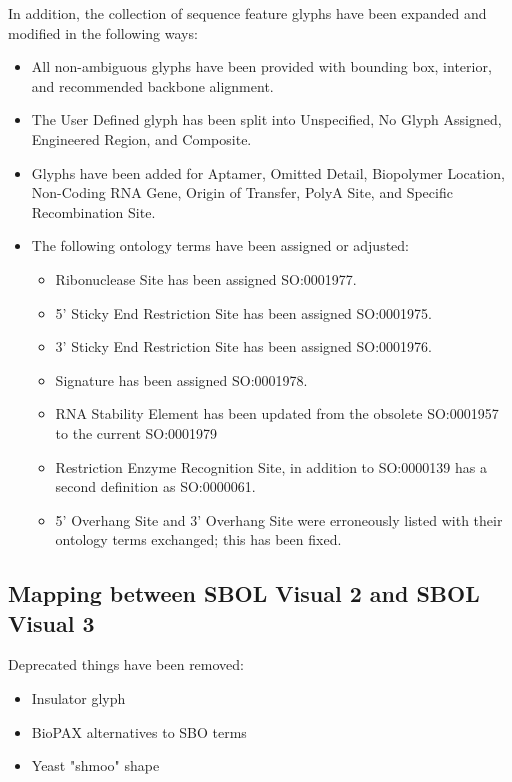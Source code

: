 In addition, the collection of sequence feature glyphs have been expanded and modified in the following ways:
\begin{itemize}
\item All non-ambiguous glyphs have been provided with bounding box, interior, and recommended backbone alignment.
\item The User Defined glyph has been split into Unspecified, No Glyph Assigned, Engineered Region, and Composite. 
\item Glyphs have been added for Aptamer, Omitted Detail, Biopolymer Location, Non-Coding RNA Gene, Origin of Transfer, PolyA Site, and Specific Recombination Site.
\item The following ontology terms have been assigned or adjusted: 
	\begin{itemize}
	\item Ribonuclease Site has been assigned SO:0001977.
	\item 5' Sticky End Restriction Site has been assigned SO:0001975.
	\item 3' Sticky End Restriction Site has been assigned SO:0001976.
	\item Signature has been assigned SO:0001978.
	\item RNA Stability Element has been updated from the obsolete SO:0001957 to the current SO:0001979
	\item Restriction Enzyme Recognition Site, in addition to SO:0000139 has a second definition as SO:0000061.
	\item 5' Overhang Site and 3' Overhang Site were erroneously listed with their ontology terms exchanged; this has been fixed.
	\end{itemize}
\end{itemize}

\subsection{Mapping between SBOL Visual 2 and SBOL Visual 3}\label{sec:sbol2}


Deprecated things have been removed:
\begin{itemize}
\item Insulator glyph
\item BioPAX alternatives to SBO terms
\item Yeast "shmoo" shape
\end{itemize}
